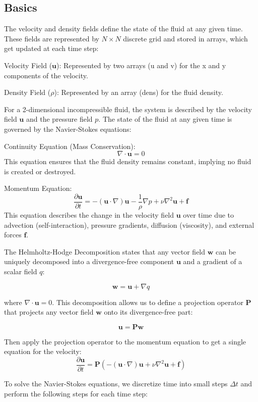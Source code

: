 \subsection{Basics}
The velocity and density fields define the state of the fluid at any given time. These fields are represented by $N\times N$ discrete grid and stored in arrays, which get updated at each time step:

Velocity Field (\(\mathbf{u}\)): Represented by two arrays (u and v) for the x and y components of the velocity.

Density Field (\(\rho\)): Represented by an array (dens) for the fluid density.

For a 2-dimensional incompressible fluid, the system is described by the velocity field \(\mathbf{u}\) and the pressure field \(p\). The state of the fluid at any given time is governed by the Navier-Stokes equations:

Continuity Equation (Mass Conservation):
\[
\nabla \cdot \mathbf{u} = 0 \tag{1}
\]
This equation ensures that the fluid density remains constant, implying no fluid is created or destroyed.

Momentum Equation:
\[
\frac{\partial \mathbf{u}}{\partial t} = -(\mathbf{u} \cdot \nabla)\mathbf{u} - \frac{1}{\rho} \nabla p + \nu \nabla^2 \mathbf{u} + \mathbf{f} \tag{2}
\]
This equation describes the change in the velocity field \(\mathbf{u}\) over time due to advection (self-interaction), pressure gradients, diffusion (viscosity), and external forces \(\mathbf{f}\).

The Helmholtz-Hodge Decomposition states that any vector field \(\mathbf{w}\) can be uniquely decomposed into a divergence-free component \(\mathbf{u}\) and a gradient of a scalar field \(q\):

\[
\mathbf{w} = \mathbf{u} + \nabla q \tag{3}
\]

where \(\nabla \cdot \mathbf{u} = 0\). This decomposition allows us to define a projection operator \(\mathbf{P}\) that projects any vector field \(\mathbf{w}\) onto its divergence-free part:

\[
\mathbf{u} = \mathbf{P} \mathbf{w} \tag{4}
\]

Then apply the projection operator to the momentum equation to get a single equation for the velocity:
\[
\frac{\partial \mathbf{u}}{\partial t} = \mathbf{P} \left( -(\mathbf{u} \cdot \nabla) \mathbf{u} + \nu \nabla^2 \mathbf{u} + \mathbf{f} \right) \tag{5}
\]

To solve the Navier-Stokes equations, we discretize time into small steps \(\Delta t\) and perform the following steps for each time step:

